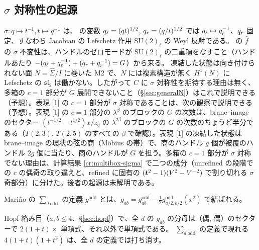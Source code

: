 \subsection{$\sigma$ 対称性の起源}
$\sigma\colon q\mapsto t^{-1}, t\mapsto q^{-1}$ は、\cite{KN17} の変数 $q_\ell = (qt)^{1/2}$, $q_r = (q/t)^{1/2}$ では $q_\ell \mapsto q_\ell^{-1}$、$q_r$ 固定、すなわち Jacobian の Lefschetz 作用 SU$(2)_\ell$ の Weyl 反射である。
\cite{KN17} の $\hat f$ の $\sigma$ 不変性は、ハンドルのゼロモードが SU$(2)_\ell$ の二重項をなすこと（ハンドルあたり $-(q_\ell + q_\ell^{-1}) + (q_r + q_r^{-1}) = G$）から来る。
凍結した状態は向き付けられない面 $N = \hat\Sigma/I$ に巻いた M2 で、$N$ には複素構造が無く $H^1(N)$ に Lefschetz の $\mathfrak{sl}_2$ は働かない。したがって $C$ に $\sigma$ 対称性を期待する理由は無く、多箱の $c = 1$ 部分が $G$ 展開できないこと（§\ref{sec:generalN}）はこれで説明できる（予想）。表現 [1] の $c = 1$ 部分が $\sigma$ 対称であることは、次の観察で説明できる（予想）。表現 [1] の $c = 1$ 部分の $\lambda^\beta$ のブロックの $G$ の次数は、brane--image のセクター $(t^{-1/2}-t^{1/2})x/z_q$ の $\lambda^{2\beta}$ のブロックの $G$ の次数のちょうど半分である（$T(2,3)$, $T(2,5)$ のすべての $\beta$ で確認）。表現 [1] の凍結した状態は brane--image の環状の弦の商（Möbius の帯）で、商のハンドル $g$ 個が被覆のハンドル $2g$ 個に当たり、商のハンドルが $G$ を担う。多箱の $c = 1$ 部分が $\sigma$ 対称でない理由は、計算結果 \ref{cr:multibox-sigma} で二つの成分（unrefined の段階での $c$ の偶奇の取り違えと、refined に固有の $(\bm{t}^2-1)(V^2-V^{-2})$ で割り切れる $\sigma$ 奇部分）に分けた。後者の起源は未解明である。

Mariño の $\sum_{d\ \mathrm{odd}}$ の定義 $g^{\mathrm{odd}}$ とは、$g_{ab} = g^{\mathrm{odd}}_{ab} - \tfrac12 g^{\mathrm{odd}}_{a/2, b/2}(x^2)$ で結ばれる。

\begin{compresult}
Hopf 絡み目（$a, b \le 4$、§\ref{sec:hopf}）で、全 $d$ の $g_{ab}$ の分母は（偶, 偶）のセクターで $2(1+t)\times$ 単項式、それ以外で単項式である。
$\sum_{d\ \mathrm{odd}}$ の定義で現れる $4(1+t)(1+t^2)$ は、全 $d$ の定義では打ち消す。
\end{compresult}


